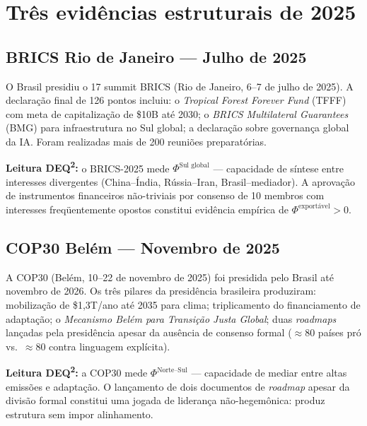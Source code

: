 \documentclass[12pt]{article}
\theoremstyle{definition}
\theoremstyle{remark}
\begin{document}
\section{Tr\^{e}s evid\^{e}ncias estruturais de 2025}

\subsection{BRICS Rio de Janeiro --- Julho de 2025}

O Brasil presidiu o 17\textdegree{} summit BRICS (Rio de Janeiro, 6--7 de julho de 2025). A declara\c{c}\~{a}o final de 126 pontos incluiu: o \textit{Tropical Forest Forever Fund} (TFFF) com meta de capitaliza\c{c}\~{a}o de \$10B até 2030; o \textit{BRICS Multilateral Guarantees} (BMG) para infraestrutura no Sul global; a declara\c{c}\~{a}o sobre governan\c{c}a global da IA. Foram realizadas mais de 200 reuniões preparatórias.

\textbf{Leitura DEQ\textsuperscript{2}:} o BRICS-2025 mede \(\Phi^{\text{Sul global}}\) --- capacidade de síntese entre interesses divergentes (China--Índia, Rússia--Iran, Brasil--mediador). A aprova\c{c}\~{a}o de instrumentos financeiros n\~{a}o-triviais por consenso de 10 membros com interesses freq\"{u}entemente opostos constitui evidência emp\'{i}rica de \(\Phi^{\text{export\'{a}vel}} > 0\).

\subsection{COP30 Bel\'{e}m --- Novembro de 2025}

A COP30 (Bel\'{e}m, 10--22 de novembro de 2025) foi presidida pelo Brasil at\'{e} novembro de 2026. Os tr\^{e}s pilares da presid\^{e}ncia brasileira produziram: mobiliza\c{c}\~{a}o de \$1,3T/ano at\'{e} 2035 para clima; triplicamento do financiamento de adapta\c{c}\~{a}o; o \textit{Mecanismo Bel\'{e}m para Transi\c{c}\~{a}o Justa Global}; duas \textit{roadmaps} lan\c{c}adas pela presid\^{e}ncia apesar da aus\^{e}ncia de consenso formal (\(\approx 80\) pa\'{i}ses pró vs.\ \(\approx 80\) contra linguagem explícita).

\textbf{Leitura DEQ\textsuperscript{2}:} a COP30 mede \(\Phi^{\text{Norte--Sul}}\) --- capacidade de mediar entre altas emiss\~{o}es e adapta\c{c}\~{a}o. O lan\c{c}amento de dois documentos de \textit{roadmap} apesar da divis\~{a}o formal constitui uma jogada de lideran\c{c}a n\~{a}o-hegemônica: produz estrutura sem impor alinhamento.
\end{document}
